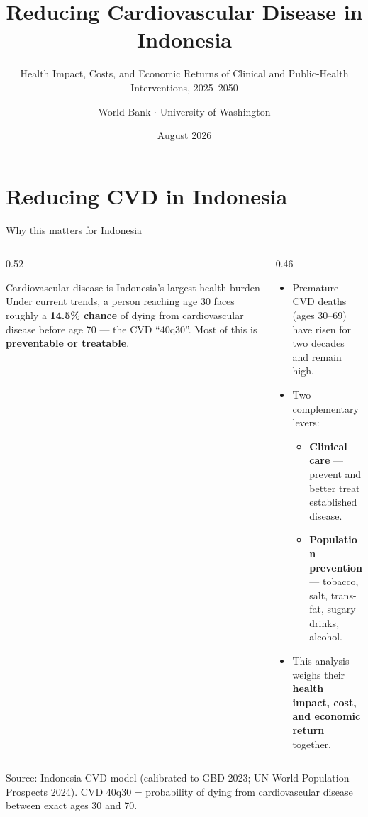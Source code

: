 \documentclass[
  ignorenonframetext,
  aspectratio=169]{beamer}
\title{Reducing Cardiovascular Disease in Indonesia}
\subtitle{Health Impact, Costs, and Economic Returns of Clinical and
Public-Health Interventions, 2025--2050}
\author{World Bank \(\cdot\) University of Washington}
\date{August 2026}
\institute{Briefing for the Ministry of Health, Republic of Indonesia}
\newcommand{\hlkey}[1]{%
  \colorbox{highlightblue}{\textcolor{wbnavy}{\textbf{#1}}}%
}
\begin{document}
\frame{\titlepage}

\section{Reducing CVD in Indonesia}\label{reducing-cvd-in-indonesia}

\begin{frame}{Why this matters for Indonesia}
\label{why-this-matters-for-indonesia}
\begin{columns}[T]
\begin{column}{0.52\textwidth}
\begin{block}{Cardiovascular disease is Indonesia's largest health burden}
\normalsize
Under current trends, a person reaching age 30 faces roughly a
\hlkey{14.5\% chance} of dying from cardiovascular disease
before age 70 --- the CVD ``40q30''. Most of this is \textbf{preventable or treatable}.
\end{block}
\end{column}
\begin{column}{0.46\textwidth}
\begin{itemize}\itemsep4pt
  \item Premature CVD deaths (ages 30--69) have risen for two decades and remain high.
  \item Two complementary levers:
  \begin{itemize}
    \item \textcolor{clinicalcol}{\textbf{Clinical care}} --- prevent and better treat established disease.
    \item \textcolor{phcol}{\textbf{Population prevention}} --- tobacco, salt, trans-fat, sugary drinks, alcohol.
  \end{itemize}
  \item This analysis weighs their \textbf{health impact, cost, and economic return} together.
\end{itemize}
\end{column}
\end{columns}

\vspace{3pt}

\footnotesize Source: Indonesia CVD model (calibrated to GBD 2023; UN
World Population Prospects 2024). CVD 40q30 = probability of dying from
cardiovascular disease between exact ages 30 and 70.
\end{frame}
\end{document}
